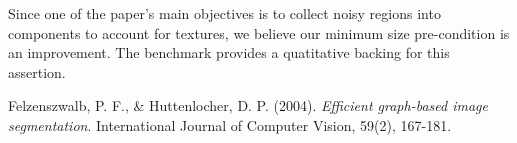 \documentclass[12pt, english, titlepage]{article}
\begin{document}
Since one of the paper's main objectives is to collect noisy regions into components to account for textures, we believe our minimum size pre-condition is an improvement. The benchmark provides a quatitative backing for this assertion.

\begin{thebibliography}{2}
\small

Felzenszwalb, P. F., \& Huttenlocher, D. P. (2004).
	\emph{Efficient graph-based image segmentation}.
	International Journal of Computer Vision, 59(2), 167-181.

\end{thebibliography}
\end{document}
